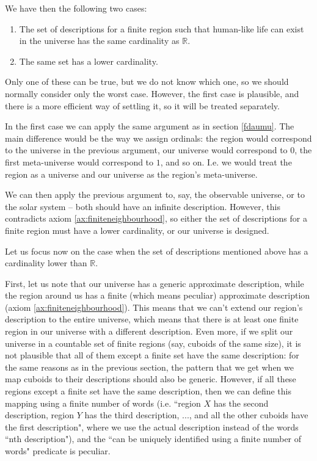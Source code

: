 \documentclass[a4paper
,draft
]{article}
\def\reale{\mathbb{R}}
\newcommand{\ghilimele}[1]{``#1"}
\begin{document}
We have then the following two cases:
\begin{enumerate}
  \item The set of descriptions for a finite region such that human-like life
      can exist in the universe has the same cardinality as $\reale$.
  \item The same set has a lower cardinality.
\end{enumerate}
Only one of these can be true, but we do not know which one, so we should
normally consider only the worst case. However, the first case is plausible,
and there is a more efficient way of settling it, so it will be treated
separately.

In the first case we can apply the same argument
as in section \ref{fdaumu}. The main difference would be the way we assign
ordinals: the region would correspond to the universe in the previous argument,
our universe would correspond to $0$,
the first meta-universe would correspond
to $1$, and so on. I.e. we would treat the region as a universe
and our universe as the region's meta-universe.

We can then apply the previous argument to, say, the observable universe, or
to the solar system -- both should have an infinite description.
However, this contradicts axiom \ref{ax:finiteneighbourhood}, so either the
set of descriptions for a finite region must have a lower cardinality, or our
universe is designed.

Let us focus now on the case when the set of descriptions mentioned above
has a cardinality lower than $\reale$.

First, let us note that our universe has a generic approximate description,
while the region around us has a finite (which means peculiar) approximate
description (axiom \ref{ax:finiteneighbourhood}).
This means that we can't
extend our region's description to the entire universe, which means that
there is at least one finite region in our universe with a different
description.
Even more, if we split our universe in a countable set of finite regions
(say, cuboids of the same size),
it is not plausible that all of them except a finite set have the same
description: for the same reasons as in the previous section,
the pattern that we get when we map cuboids to their descriptions should also
be generic.
However, if all these regions except a finite set have the same
description, then we can define this mapping using a finite number of words
(i.e. \ghilimele{region $X$ has the second description,
region $Y$ has the third description, ..., and all the other cuboids have the
first description}, where we use the actual description instead of the words
\ghilimele{nth description}),
and the \ghilimele{can be uniquely identified using a
finite number of words} predicate is peculiar.
\end{document}
